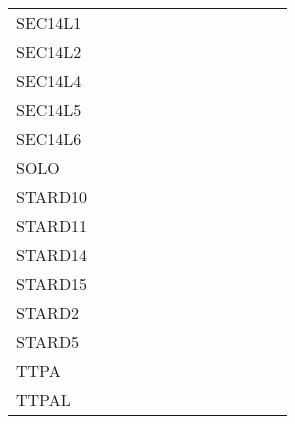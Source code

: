 \begin{tabular}{lllllllllllll}
	SEC14L1 &  &  & \cellcolor{emblgreen!75} &  &  & \cellcolor{emblgreen!75} &  &  &  &  &  & \cellcolor{emblgreen!75}\\
	SEC14L2 &  &  &  &  &  & \cellcolor{emblyellow!75} &  &  & \cellcolor{emblpetrol!75} &  &  & \\
	SEC14L4 &  &  &  &  &  &  &  &  & \cellcolor{emblpetrol!75} &  &  & \\
	SEC14L5 &  &  &  &  &  &  &  &  &  &  &  & \\
	SEC14L6 &  &  &  &  &  & \cellcolor{emblgreen!75} & \cellcolor{emblgreen!75} &  & \cellcolor{emblpetrol!75} &  &  & \\
	SOLO &  &  & \cellcolor{emblgreen!75} &  &  & \cellcolor{emblgreen!75} &  &  &  &  &  & \\
	STARD10 &  &  &  &  &  & \cellcolor{emblyellow!75} & \cellcolor{emblpetrol!75} &  & \cellcolor{emblpetrol!75} & \cellcolor{emblpetrol!75} &  & \\
	STARD11 &  &  & \cellcolor{emblgreen!75} &  &  & \cellcolor{emblgreen!75} &  &  &  &  &  & \cellcolor{emblgreen!75}\\
	STARD14 &  &  &  &  &  &  &  &  &  &  &  & \\
	STARD15 &  &  &  &  &  &  &  &  &  &  &  & \\
	STARD2 &  &  &  &  &  &  &  &  &  &  &  & \\
	STARD5 &  &  &  &  &  & \cellcolor{emblgreen!75} &  &  &  &  &  & \\
	TTPA &  &  &  &  &  &  &  &  &  &  &  & \\
	TTPAL &  &  &  &  &  &  &  &  &  &  &  & \\
\end{tabular}
